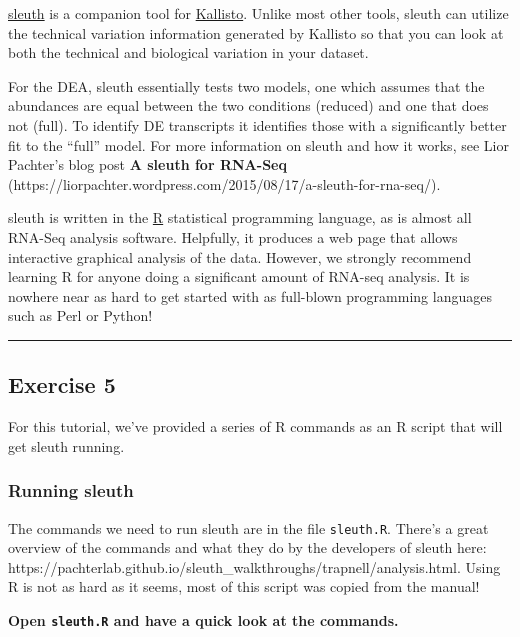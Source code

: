 \documentclass[11pt]{article}
\begin{document}
\href{https://pachterlab.github.io/sleuth}{sleuth} is a companion tool
for \href{https://pachterlab.github.io/kallisto}{Kallisto}. Unlike most
other tools, sleuth can utilize the technical variation information
generated by Kallisto so that you can look at both the technical and
biological variation in your dataset.

For the DEA, sleuth essentially tests two models, one which assumes that
the abundances are equal between the two conditions (reduced) and one
that does not (full). To identify DE transcripts it identifies those
with a significantly better fit to the ``full'' model. For more
information on sleuth and how it works, see Lior Pachter's blog post
\textbf{A sleuth for RNA-Seq}
(https://liorpachter.wordpress.com/2015/08/17/a-sleuth-for-rna-seq/).

sleuth is written in the \href{https://www.r-project.org/}{R}
statistical programming language, as is almost all RNA-Seq analysis
software. Helpfully, it produces a web page that allows interactive
graphical analysis of the data. However, we strongly recommend learning
R for anyone doing a significant amount of RNA-seq analysis. It is
nowhere near as hard to get started with as full-blown programming
languages such as Perl or Python!

    \begin{center}\rule{0.5\linewidth}{.4pt}\end{center}

    \hypertarget{exercise-5}{%
\subsection{Exercise 5}\label{exercise-5}}

    For this tutorial, we've provided a series of R commands as an R script
that will get sleuth running.

    \hypertarget{running-sleuth}{%
\subsubsection{Running sleuth}\label{running-sleuth}}

The commands we need to run sleuth are in the file \texttt{sleuth.R}.
There's a great overview of the commands and what they do by the
developers of sleuth here:
https://pachterlab.github.io/sleuth\_walkthroughs/trapnell/analysis.html.
Using R is not as hard as it seems, most of this script was copied from
the manual!

\textbf{Open \texttt{sleuth.R} and have a quick look at the commands.}
\end{document}
